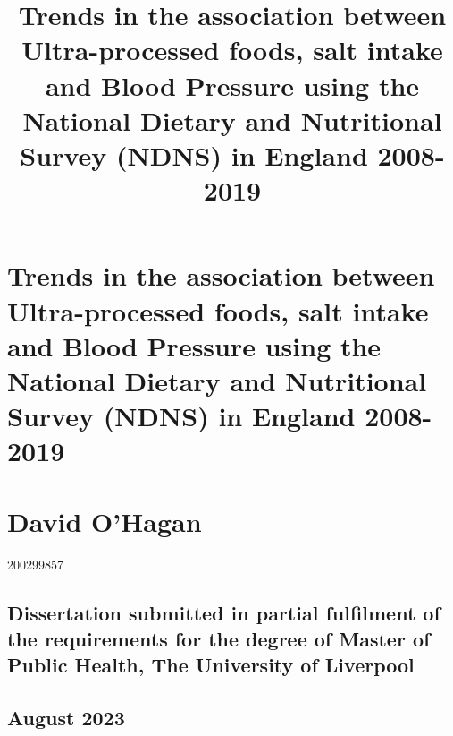 \documentclass[
]{article}
\title{Trends in the association between Ultra-processed foods, salt
intake and Blood Pressure using the National Dietary and Nutritional
Survey (NDNS) in England 2008-2019}
\author{}
\date{\vspace{-2.5em}}
\begin{document}
\maketitle

{
\setcounter{tocdepth}{2}
\tableofcontents
}
\hypertarget{trends-in-the-association-between-ultra-processed-foods-salt-intake-and-blood-pressure-using-the-national-dietary-and-nutritional-survey-ndns-in-england-2008-2019}{%
\section*{Trends in the association between Ultra-processed foods, salt
intake and Blood Pressure using the National Dietary and Nutritional
Survey (NDNS) in England
2008-2019}\label{trends-in-the-association-between-ultra-processed-foods-salt-intake-and-blood-pressure-using-the-national-dietary-and-nutritional-survey-ndns-in-england-2008-2019}}

\hypertarget{david-ohagan}{%
\section*{David O'Hagan}\label{david-ohagan}}

200299857

\hypertarget{dissertation-submitted-in-partial-fulfilment-of-the-requirements-for-the-degree-of-master-of-public-health-the-university-of-liverpool}{%
\subsection*{Dissertation submitted in partial fulfilment of the
requirements for the degree of Master of Public Health, The University
of
Liverpool}\label{dissertation-submitted-in-partial-fulfilment-of-the-requirements-for-the-degree-of-master-of-public-health-the-university-of-liverpool}}

\hypertarget{august-2023}{%
\subsection*{August 2023}\label{august-2023}}
\end{document}
